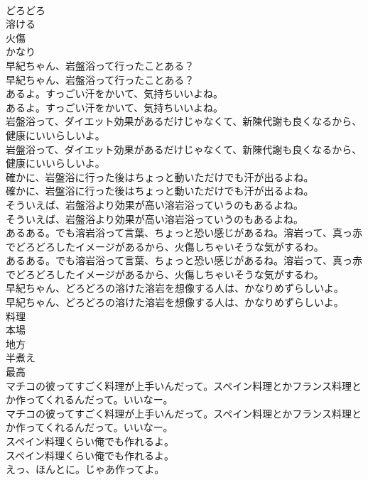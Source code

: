 \documentclass[8pt]{extreport}
\begin{document}
\begin{CJK}{UTF8}{min}
\\	どろどろ
\\	溶ける
\\	火傷
\\	かなり
\\	早紀ちゃん、岩盤浴って行ったことある？	
\\	早紀ちゃん、岩盤浴って行ったことある？ 
\\	あるよ。すっごい汗をかいて、気持ちいいよね。	
\\	あるよ。すっごい汗をかいて、気持ちいいよね。 
\\	岩盤浴って、ダイエット効果があるだけじゃなくて、新陳代謝も良くなるから、健康にいいらしいよ。	
\\	岩盤浴って、ダイエット効果があるだけじゃなくて、新陳代謝も良くなるから、健康にいいらしいよ。 
\\	確かに、岩盤浴に行った後はちょっと動いただけでも汗が出るよね。	
\\	確かに、岩盤浴に行った後はちょっと動いただけでも汗が出るよね。 
\\	そういえば、岩盤浴より効果が高い溶岩浴っていうのもあるよね。	
\\	そういえば、岩盤浴より効果が高い溶岩浴っていうのもあるよね。 
\\	あるある。でも溶岩浴って言葉、ちょっと恐い感じがあるね。溶岩って、真っ赤でどろどろしたイメージがあるから、火傷しちゃいそうな気がするわ。	
\\	あるある。でも溶岩浴って言葉、ちょっと恐い感じがあるね。溶岩って、真っ赤でどろどろしたイメージがあるから、火傷しちゃいそうな気がするわ。 
\\	早紀ちゃん、どろどろの溶けた溶岩を想像する人は、かなりめずらしいよ。	
\\	早紀ちゃん、どろどろの溶けた溶岩を想像する人は、かなりめずらしいよ。 
\\	料理
\\	本場
\\	地方
\\	半煮え
\\	最高
\\	マチコの彼ってすごく料理が上手いんだって。スペイン料理とかフランス料理とか作ってくれるんだって。いいなー。	
\\	マチコの彼ってすごく料理が上手いんだって。スペイン料理とかフランス料理とか作ってくれるんだって。いいなー。 
\\	スペイン料理くらい俺でも作れるよ。	
\\	スペイン料理くらい俺でも作れるよ。 
\\	えっ、ほんとに。じゃあ作ってよ。	

\end{CJK}
\end{document}
